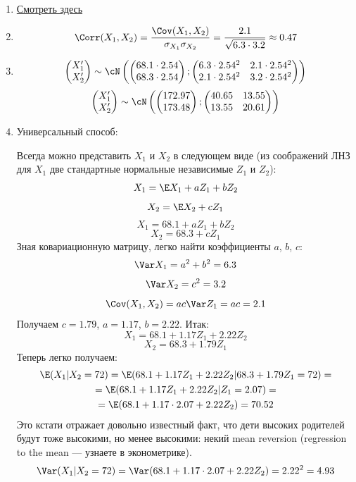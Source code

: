 \begin{enumerate}
\begin{enumerate}
\item \href{http://johnhawks.net/explainer/stats/heritability-and-stature/}{Смотреть здесь}
\item \[ \Corr(X_1, X_2) = \frac{\Cov(X_1, X_2)}{\sigma_{X_1} \sigma_{X_2}} = \frac{2.1}{\sqrt{6.3\cdot 3.2}} \approx 0.47   \]
\item \[\begin{pmatrix}
X_1' \\
X_2'
\end{pmatrix} \sim \cN \left( \begin{pmatrix}
68.1\cdot 2.54 \\
68.3\cdot 2.54
\end{pmatrix} ; \begin{pmatrix}
6.3\cdot 2.54^2 & 2.1 \cdot 2.54^2\\
2.1\cdot 2.54^2 & 3.2 \cdot 2.54^2
\end{pmatrix} \right) \]
\[\begin{pmatrix}
X_1' \\
X_2'
\end{pmatrix} \sim \cN \left( \begin{pmatrix}
172.97 \\
173.48
\end{pmatrix} ; \begin{pmatrix}
40.65 & 13.55\\
13.55 & 20.61
\end{pmatrix} \right) \]
\item Универсальный способ:

Всегда можно представить $X_1$ и $X_2$ в следующем виде (из соображений ЛНЗ для $X_1$ две стандартные нормальные независимые $Z_1$ и $Z_2$):
\[X_1 = \E X_1 + a Z_1 + b Z_2 \]
\[X_2 = \E X_2 + c Z_1 \]
\[X_1 = 68.1 + a Z_1 + b Z_2 \]
\[X_2 = 68.3 + c Z_1 \]
Зная ковариационную матрицу, легко найти коэффициенты $a$, $b$, $c$:
\[\Var X_1 = a^2 + b^2 = 6.3   \]
\[\Var X_2 = c^2 = 3.2   \]
\[\Cov (X_1, X_2) = ac\Var Z_1= ac = 2.1   \]
Получаем $c = 1.79$, $a = 1.17$, $b=2.22$.
Итак: \[X_1 = 68.1 + 1.17 Z_1 + 2.22 Z_2 \]
\[X_2 = 68.3 + 1.79 Z_1 \]
Теперь легко получаем:
\begin{multline*}
\E (X_1 | X_2 = 72) = \E ( 68.1 + 1.17 Z_1 + 2.22 Z_2|  68.3 + 1.79 Z_1 = 72) =   \\
 =   \E ( 68.1 + 1.17 Z_1 + 2.22 Z_2|  Z_1 = 2.07) = \\
 = \E (68.1 + 1.17 \cdot 2.07 + 2.22 Z_2) = 70.52
\end{multline*}
Это кстати отражает довольно известный факт, что дети высоких родителей будут тоже высокими, но менее высокими: некий mean reversion (regression to the mean — узнаете в эконометрике).
\[ \Var (X_1 | X_2 = 72) = \Var ( 68.1 + 1.17 \cdot 2.07 + 2.22 Z_2) = 2.22^2 = 4.93   \]


\end{enumerate}
\end{enumerate}
